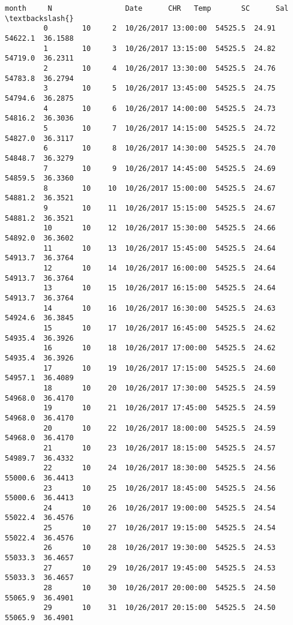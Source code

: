 \documentclass[11pt]{article}
\begin{document}
\begin{Verbatim}[commandchars=\\\{\}]
               month     N                 Date      CHR   Temp       SC      Sal  \textbackslash{}
         0        10     2  10/26/2017 13:00:00  54525.5  24.91  54622.1  36.1588   
         1        10     3  10/26/2017 13:15:00  54525.5  24.82  54719.0  36.2311   
         2        10     4  10/26/2017 13:30:00  54525.5  24.76  54783.8  36.2794   
         3        10     5  10/26/2017 13:45:00  54525.5  24.75  54794.6  36.2875   
         4        10     6  10/26/2017 14:00:00  54525.5  24.73  54816.2  36.3036   
         5        10     7  10/26/2017 14:15:00  54525.5  24.72  54827.0  36.3117   
         6        10     8  10/26/2017 14:30:00  54525.5  24.70  54848.7  36.3279   
         7        10     9  10/26/2017 14:45:00  54525.5  24.69  54859.5  36.3360   
         8        10    10  10/26/2017 15:00:00  54525.5  24.67  54881.2  36.3521   
         9        10    11  10/26/2017 15:15:00  54525.5  24.67  54881.2  36.3521   
         10       10    12  10/26/2017 15:30:00  54525.5  24.66  54892.0  36.3602   
         11       10    13  10/26/2017 15:45:00  54525.5  24.64  54913.7  36.3764   
         12       10    14  10/26/2017 16:00:00  54525.5  24.64  54913.7  36.3764   
         13       10    15  10/26/2017 16:15:00  54525.5  24.64  54913.7  36.3764   
         14       10    16  10/26/2017 16:30:00  54525.5  24.63  54924.6  36.3845   
         15       10    17  10/26/2017 16:45:00  54525.5  24.62  54935.4  36.3926   
         16       10    18  10/26/2017 17:00:00  54525.5  24.62  54935.4  36.3926   
         17       10    19  10/26/2017 17:15:00  54525.5  24.60  54957.1  36.4089   
         18       10    20  10/26/2017 17:30:00  54525.5  24.59  54968.0  36.4170   
         19       10    21  10/26/2017 17:45:00  54525.5  24.59  54968.0  36.4170   
         20       10    22  10/26/2017 18:00:00  54525.5  24.59  54968.0  36.4170   
         21       10    23  10/26/2017 18:15:00  54525.5  24.57  54989.7  36.4332   
         22       10    24  10/26/2017 18:30:00  54525.5  24.56  55000.6  36.4413   
         23       10    25  10/26/2017 18:45:00  54525.5  24.56  55000.6  36.4413   
         24       10    26  10/26/2017 19:00:00  54525.5  24.54  55022.4  36.4576   
         25       10    27  10/26/2017 19:15:00  54525.5  24.54  55022.4  36.4576   
         26       10    28  10/26/2017 19:30:00  54525.5  24.53  55033.3  36.4657   
         27       10    29  10/26/2017 19:45:00  54525.5  24.53  55033.3  36.4657   
         28       10    30  10/26/2017 20:00:00  54525.5  24.50  55065.9  36.4901   
         29       10    31  10/26/2017 20:15:00  54525.5  24.50  55065.9  36.4901   

\end{Verbatim}
\end{document}
